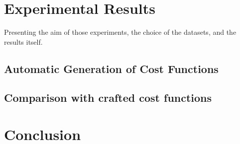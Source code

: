 \documentclass[letterpaper]{article} %
\begin{document}
\section{Experimental Results}\label{sec:xp}
Presenting the aim of those experiments, the choice of the datasets, and the results itself.

\subsection{Automatic Generation of Cost Functions}
\label{subsec:xpgeneration}

\subsection{Comparison with crafted cost functions}\label{subsec:xpcomparison}

\section{Conclusion}\label{sec:conclusion}


%


\end{document}
